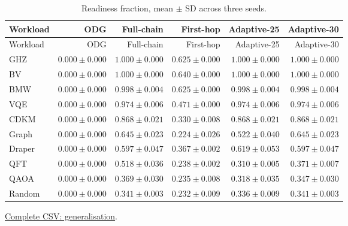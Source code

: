 \begin{center}\small
\begin{longtable}{lrrrrr}
\caption{Readiness fraction, mean $\pm$ SD across three seeds.}\\
\toprule
Workload & ODG & Full-chain & First-hop & Adaptive-25 & Adaptive-30 \\
\midrule\endfirsthead
\toprule
Workload & ODG & Full-chain & First-hop & Adaptive-25 & Adaptive-30 \\
\midrule\endhead
GHZ & $0.000 \pm 0.000$ & $1.000 \pm 0.000$ & $0.625 \pm 0.000$ & $1.000 \pm 0.000$ & $1.000 \pm 0.000$ \\
BV & $0.000 \pm 0.000$ & $1.000 \pm 0.000$ & $0.640 \pm 0.000$ & $1.000 \pm 0.000$ & $1.000 \pm 0.000$ \\
BMW & $0.000 \pm 0.000$ & $0.998 \pm 0.004$ & $0.625 \pm 0.000$ & $0.998 \pm 0.004$ & $0.998 \pm 0.004$ \\
VQE & $0.000 \pm 0.000$ & $0.974 \pm 0.006$ & $0.471 \pm 0.000$ & $0.974 \pm 0.006$ & $0.974 \pm 0.006$ \\
CDKM & $0.000 \pm 0.000$ & $0.868 \pm 0.021$ & $0.330 \pm 0.008$ & $0.868 \pm 0.021$ & $0.868 \pm 0.021$ \\
Graph & $0.000 \pm 0.000$ & $0.645 \pm 0.023$ & $0.224 \pm 0.026$ & $0.522 \pm 0.040$ & $0.645 \pm 0.023$ \\
Draper & $0.000 \pm 0.000$ & $0.597 \pm 0.047$ & $0.367 \pm 0.002$ & $0.619 \pm 0.053$ & $0.597 \pm 0.047$ \\
QFT & $0.000 \pm 0.000$ & $0.518 \pm 0.036$ & $0.238 \pm 0.002$ & $0.310 \pm 0.005$ & $0.371 \pm 0.007$ \\
QAOA & $0.000 \pm 0.000$ & $0.369 \pm 0.030$ & $0.235 \pm 0.008$ & $0.318 \pm 0.035$ & $0.347 \pm 0.030$ \\
Random & $0.000 \pm 0.000$ & $0.341 \pm 0.003$ & $0.232 \pm 0.009$ & $0.336 \pm 0.009$ & $0.341 \pm 0.003$ \\
\bottomrule\end{longtable}\end{center}
{\footnotesize \href{https://github.com/sanjeevkrishnaa/Compiler-Driven-ACE/blob/codex/ace-scheduler-correctness/docs/latex/oct25_pre_golden/data/generalisation.csv}{Complete CSV: generalisation}. }

